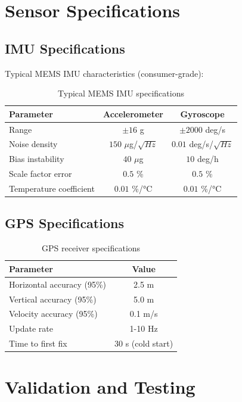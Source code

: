 \documentclass[12pt,a4paper]{article}
\begin{document}
\section{Sensor Specifications}

\subsection{IMU Specifications}

Typical MEMS IMU characteristics (consumer-grade):

\begin{table}[h]
\centering
\begin{tabular}{lcc}
\toprule
Parameter & Accelerometer & Gyroscope \\
\midrule
Range & $\pm 16$ g & $\pm 2000$ deg/s \\
Noise density & $150$ $\mu$g/$\sqrt{Hz}$ & $0.01$ deg/s/$\sqrt{Hz}$ \\
Bias instability & $40$ $\mu$g & $10$ deg/h \\
Scale factor error & $0.5$ \% & $0.5$ \% \\
Temperature coefficient & $0.01$ \%/°C & $0.01$ \%/°C \\
\bottomrule
\end{tabular}
\caption{Typical MEMS IMU specifications}
\end{table}

\subsection{GPS Specifications}

\begin{table}[h]
\centering
\begin{tabular}{lc}
\toprule
Parameter & Value \\
\midrule
Horizontal accuracy (95\%) & 2.5 m \\
Vertical accuracy (95\%) & 5.0 m \\
Velocity accuracy (95\%) & 0.1 m/s \\
Update rate & 1-10 Hz \\
Time to first fix & 30 s (cold start) \\
\bottomrule
\end{tabular}
\caption{GPS receiver specifications}
\end{table}

\section{Validation and Testing}
\end{document}
